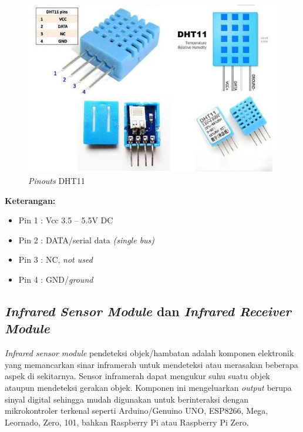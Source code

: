 \begin{figure}[H]
	\centerline {
		\includegraphics[width=\linewidth]{bab3/img/pinout-DHT11.jpg}
	}
	\caption{\textit{Pinouts} DHT11}
	\label{figure:pinout-DHT11}
\end{figure}

\textbf{Keterangan:}
\begin{itemize}
	\item Pin 1 : Vcc 3.5 – 5.5V DC
	\item Pin 2 : DATA/serial data \textit{(single bus)}
	\item Pin 3 : NC, \textit{not used}
	\item Pin 4 : GND/\textit{ground}
\end{itemize}

\subsection{\textit{Infrared Sensor Module} dan \textit{Infrared Receiver Module}}
\tab \textit{Infrared sensor module} pendeteksi objek/hambatan adalah komponen elektronik yang memancarkan sinar inframerah untuk mendeteksi atau merasakan beberapa aspek di sekitarnya. Sensor inframerah dapat mengukur suhu suatu objek ataupun mendeteksi gerakan objek. Komponen ini mengeluarkan \textit{output} berupa sinyal digital sehingga mudah digunakan untuk berinteraksi dengan mikrokontroler terkenal seperti Arduino/Genuino UNO, ESP8266, Mega, Leornado, Zero, 101, bahkan Raspberry Pi atau Raspberry Pi Zero.\\

